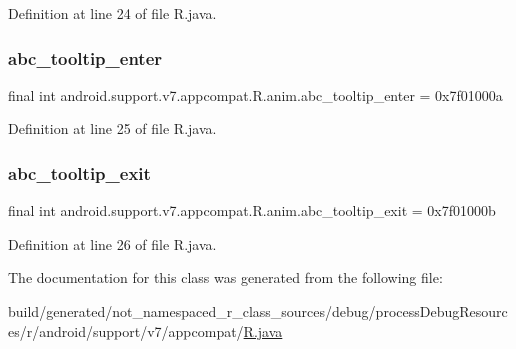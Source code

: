 Definition at line 24 of file R.\+java.

\mbox{\label{classandroid_1_1support_1_1v7_1_1appcompat_1_1_r_1_1anim_a48bf3ae33d447cbde3d73a282b5c81ef}} 
\subsubsection{\texorpdfstring{abc\_tooltip\_enter}{abc\_tooltip\_enter}}
{\footnotesize\ttfamily final int android.\+support.\+v7.\+appcompat.\+R.\+anim.\+abc\+\_\+tooltip\+\_\+enter = 0x7f01000a\hspace{0.3cm}{\ttfamily [static]}}



Definition at line 25 of file R.\+java.

\mbox{\label{classandroid_1_1support_1_1v7_1_1appcompat_1_1_r_1_1anim_a497b957ed79509d03b990691d9bd02a3}} 
\subsubsection{\texorpdfstring{abc\_tooltip\_exit}{abc\_tooltip\_exit}}
{\footnotesize\ttfamily final int android.\+support.\+v7.\+appcompat.\+R.\+anim.\+abc\+\_\+tooltip\+\_\+exit = 0x7f01000b\hspace{0.3cm}{\ttfamily [static]}}



Definition at line 26 of file R.\+java.



The documentation for this class was generated from the following file\+:\begin{DoxyCompactItemize}
\item 
build/generated/not\+\_\+namespaced\+\_\+r\+\_\+class\+\_\+sources/debug/process\+Debug\+Resources/r/android/support/v7/appcompat/\mbox{\hyperlink{android_2support_2v7_2appcompat_2_r_8java}{R.\+java}}\end{DoxyCompactItemize}
